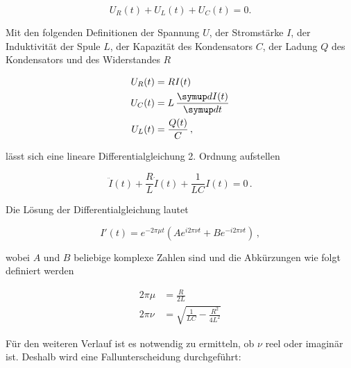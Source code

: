 \begin{equation*}
  U_R(t) + U_L(t) + U_C(t) = 0.
\end{equation*}

Mit den folgenden Definitionen der Spannung $U$, der Stromstärke $I$, der Induktivität der Spule $L$,
der Kapazität des Kondensators $C$, der Ladung $Q$ des Kondensators und des Widerstandes $R$

\begin{align*}
  U_R(t) &= R I(t) \\
  U_C(t) &= L \, \frac{\symup d I(t)}{\symup d t} \\
  U_L(t) &= \frac{Q(t)}{C} \, ,
\end{align*}

lässt sich eine lineare Differentialgleichung 2. Ordnung aufstellen

\begin{equation*}
  \ddot{I}(t) + \frac{R}{L} \dot{I}(t) + \frac{1}{LC} I(t) = 0 \, .
\end{equation*}

Die Lösung der Differentialgleichung lautet

\begin{equation}
  I'(t) = e^{-2 \pi \mu t} (A e^{i 2 \pi \nu t} + B e^{-i 2 \pi \nu t}) \, ,
  \label{Gleichung1}
\end{equation}

wobei $A$ und $B$ beliebige komplexe Zahlen sind und die Abkürzungen wie folgt definiert werden

\begin{align}
  2 \pi \mu &= \frac{R}{2L} \\
  2 \pi \nu &= \sqrt{\frac{1}{LC} - \frac{R^2}{4L^2}}
\end{align}

Für den weiteren Verlauf ist es notwendig zu ermitteln, ob $\nu$ reel oder imaginär ist. Deshalb wird eine
Fallunterscheidung durchgeführt:


